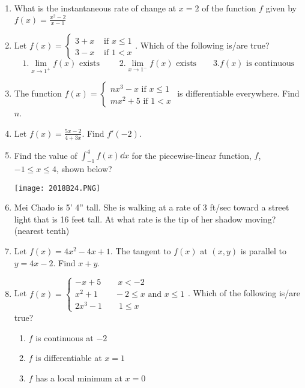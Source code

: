 \documentclass[../uilmath.tex]{subfiles}
\begin{document}
\begin{enumerate}[label=\bfseries\arabic*.]
    \item %
    What is the instantaneous rate of change at $x=2$ of the function $f$ given by $f(x)=\frac{x^2-2}{x-1}$

    \item %
    Let $f(x)=\begin{cases}
        3 + x & \text{ if }x\leq 1 \\
        3-x & \text{ if }1 < x 
    \end{cases}$. Which of the following is/are true? 
    \[ 1. \lim_{x\to 1^+} f(x) \text{ exists } \qquad 2. \lim_{x\to 1^-} f(x) \text{ exists} \qquad 3. f(x) \text{ is continuous}\]

    \item %
    The function $f(x)=\begin{cases}
        nx^3-x \text{ if } x\leq 1 \\
        mx^2+5 \text{ if } 1<x 
    \end{cases}$ is differentiable everywhere. Find $n$.

    \item %
    Let $f(x)=\frac{5x-2}{4+3x}$. Find $f'(-2)$.

    \item %
    Find the value of $\int_{-1}^4 f(x)\dd x$ for the piecewise-linear function, $f$, $-1\leq x\leq 4$, shown below?
    \begin{center}
        \texttt{[image: 2018B24.PNG]}
    \end{center}

    \item %
    Mei Chado is 5' 4'' tall. She is walking at a rate of 3 ft/sec toward a street light that is 16 feet tall. At what rate is the tip of her shadow moving? (nearest tenth)

    \item %
    Let $f(x)=4x^2-4x+1$. The tangent to $f(x)$ at $(x,y)$ is parallel to $y=4x-2$. Find $x+y$.

    \item %
    Let $f(x) = \begin{cases}
        -x+5 \qquad x<-2 \\ 
        x^2+1 \qquad -2\leq x \text{ and } x\leq 1 \\ 
        2x^3-1 \qquad 1\leq x
    \end{cases}$. Which of the following is/are true?

    \begin{enumerate}
        \item $f$ is continuous at $-2$
        \item $f$ is differentiable at $x=1$
        \item $f$ has a local minimum at $x=0$
    \end{enumerate}


\end{enumerate}
\end{document}
